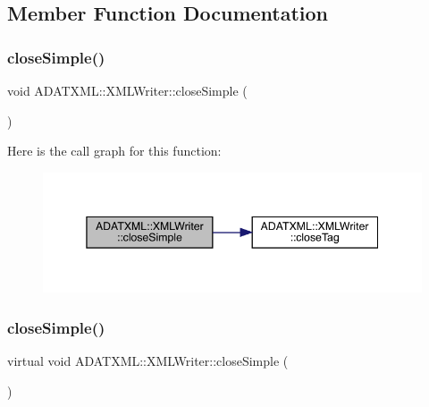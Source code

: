 \subsection{Member Function Documentation}
\mbox{\label{classADATXML_1_1XMLWriter_ab8cdb27adc2f4d3b893b8234d13f9e70}} 
\subsubsection{\texorpdfstring{closeSimple()}{closeSimple()}\hspace{0.1cm}{\footnotesize\ttfamily [1/3]}}
{\footnotesize\ttfamily void A\+D\+A\+T\+X\+M\+L\+::\+X\+M\+L\+Writer\+::close\+Simple (\begin{DoxyParamCaption}{ }\end{DoxyParamCaption})\hspace{0.3cm}{\ttfamily [virtual]}}

Here is the call graph for this function\+:
\nopagebreak
\begin{figure}[H]
\begin{center}
\leavevmode
\includegraphics[width=345pt]{da/da7/classADATXML_1_1XMLWriter_ab8cdb27adc2f4d3b893b8234d13f9e70_cgraph}
\end{center}
\end{figure}
\mbox{\label{classADATXML_1_1XMLWriter_a7141f35d34f4d15bbaf15d9124a4e054}} 
\subsubsection{\texorpdfstring{closeSimple()}{closeSimple()}\hspace{0.1cm}{\footnotesize\ttfamily [2/3]}}
{\footnotesize\ttfamily virtual void A\+D\+A\+T\+X\+M\+L\+::\+X\+M\+L\+Writer\+::close\+Simple (\begin{DoxyParamCaption}{ }\end{DoxyParamCaption})\hspace{0.3cm}{\ttfamily [virtual]}}

